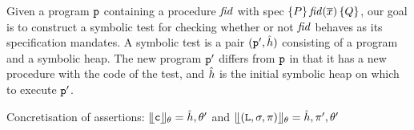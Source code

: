 \noindent Given a \jsil program $\mathtt{p}$ containing a procedure $\mathit{fid}$ with spec {\small $\{ P \} \, \mathit{fid}(\overline{x}) \,  \{ Q \}$}, 
our goal is to construct a symbolic test for checking whether or not $\mathit{fid}$ behaves as its specification mandates.
A symbolic test is a pair $(\mathtt{p}', \hat{h})$ consisting of a \jsil program and a symbolic heap. The new program $\mathtt{p}'$ 
differs from $\mathtt{p}$ in that it has a new \jsilmain procedure with the code of the test, and $\hat{h}$ is the initial 
symbolic heap on which to execute $\mathtt{p}'$. 

\begin{display}{Concretisation of \jsil assertions: $\llfloor \mathtt{c} \rrfloor_{\theta} = \hat{h}, \theta'$ and $\llfloor (\mathtt{L}, \sigma, \pi) \rrfloor_{\theta} = \hat{h}, \pi', \theta'$}
{\scriptsize
{}}
\end{display}

